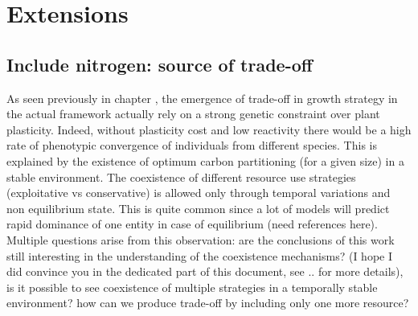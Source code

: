 
\chapter{Extensions}


%
%

\section{Include nitrogen: source of trade-off} %

As seen previously in chapter %
, the emergence of trade-off in growth strategy in the actual framework actually rely on a strong genetic constraint over plant plasticity. Indeed, without plasticity cost and low reactivity there would be a high rate of phenotypic convergence of individuals from different species. This is explained by the existence of optimum carbon partitioning (for a given size) in a stable environment. The coexistence of different resource use strategies (exploitative vs conservative) is allowed only through temporal variations and non equilibrium state. This is quite common since a lot of models will predict rapid dominance of one entity in case of equilibrium (need references here).\\
Multiple questions arise from this observation: are the conclusions of this work still interesting in the understanding of the coexistence mechanisms? (I hope I did convince you in the dedicated part of this document, see .. for more details), is it possible to see coexistence of multiple strategies in a temporally stable environment? how can we produce trade-off by including only one more resource?\\


